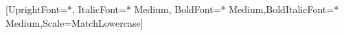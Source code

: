 
\usepackage{Alegreya}
\usepackage{AlegreyaSans}

\ifPDFTeX
\else
    \ifXeTeX
    \else %
    \fi
    \setmonofont{Fira Code}[UprightFont={*}, ItalicFont={* Medium}, BoldFont={* Medium},BoldItalicFont={* Medium},Scale=MatchLowercase]




\fi
